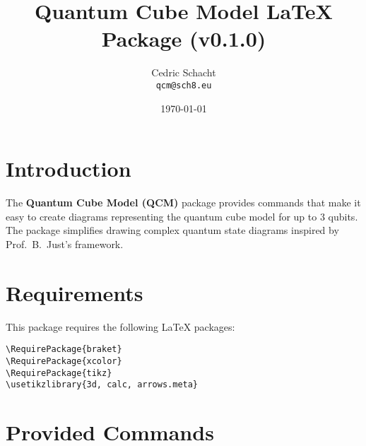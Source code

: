 \documentclass{article}
\title{Quantum Cube Model LaTeX Package (v0.1.0)}
\author{Cedric Schacht \\ \texttt{qcm@sch8.eu}}
\date{\today}
\begin{document}
\maketitle

\section*{Introduction}

The \textbf{Quantum Cube Model (QCM)} package provides commands that make it easy to create diagrams representing the quantum cube model for up to 3 qubits.
The package simplifies drawing complex quantum state diagrams inspired by Prof.~B.~Just's framework.

\section*{Requirements}

This package requires the following LaTeX packages:

\begin{verbatim}
\RequirePackage{braket}
\RequirePackage{xcolor}
\RequirePackage{tikz}
\usetikzlibrary{3d, calc, arrows.meta}
\end{verbatim}

\section*{Provided Commands}
\end{document}
